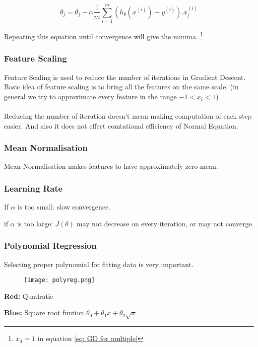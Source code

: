    \begin{equation} \label {eq: GD for multiple}
      \theta_j =  \theta_j - \alpha \frac{1}{m} \sum_{i=1}^{m} (h_\theta(x^{(i)})-y^{(i)}).x_j^{(i)}
    \end{equation}

    Repeating this equation until convergence will give the minima. \footnote[1]{$x_0 = 1$ in equation \ref{eq: GD for multiple}}

  \subsubsection{Feature Scaling}
    Feature Scaling is used to reduce the number of iterations in Gradient Descent. Basic idea of feature scaling is to bring all the features on the same scale. (in general we try to approximate every feature in the range $ -1 < x_i < 1 $)
    \\ \\ Reducing the number of iteration doesn't mean making computation of each step easier. And also it does not effect comtational efficiency of Normal Equation.

  \subsubsection{Mean Normalisation}
    Mean Normalisation makes features to have approximately zero mean.

  \subsubsection{Learning Rate}
    If $\alpha$ is too small: slow convergence.

    if $\alpha$ is too large: $J(\theta)$ may not decrease on every iteration, or may not converge.

  \subsubsection{Polynomial Regression}
    Selecting proper polynomial for fitting data is very important.

    \begin{figure}[h]
      \centering
      \texttt{[image: polyreg.png]}
    \end{figure}

    \textbf{Red:} Quadratic

    \textbf {Blue:} Square root funtion $ \theta_0+\theta_1x+\theta_2\sqrt{x} $


